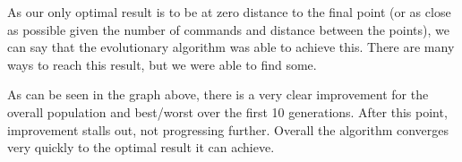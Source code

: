 \documentclass{article}
\begin{document}
As our only optimal result is to be at zero distance to the final point (or as close as possible given the number of commands and distance between the points), we can say that the evolutionary algorithm was able to achieve this. There are many ways to reach this result, but we were able to find some. 

As can be seen in the graph above, there is a very clear improvement for the overall population and best/worst over the first 10 generations. After this point, improvement stalls out, not progressing further. Overall the algorithm converges very quickly to the optimal result it can achieve. 
\end{document}
